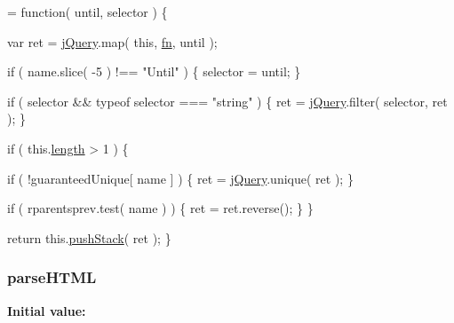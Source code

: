\begin{DoxyCode}
= \textcolor{keyword}{function}( until, selector ) \{


        var ret = \hyperlink{jquery-1_810_82-vsdoc_8js_add5237586d970a38a81f990e8eb28c6c}{jQuery}.map( \textcolor{keyword}{this}, \hyperlink{jquery-1_810_82-vsdoc_8js_acef6bdaf6b9b20fdcca1ea86f0902c3b}{fn}, until );

        \textcolor{keywordflow}{if} ( name.slice( -5 ) !== \textcolor{stringliteral}{"Until"} ) \{
            selector = until;
        \}

        \textcolor{keywordflow}{if} ( selector && typeof selector === \textcolor{stringliteral}{"string"} ) \{
            ret = \hyperlink{jquery-1_810_82-vsdoc_8js_add5237586d970a38a81f990e8eb28c6c}{jQuery}.filter( selector, ret );
        \}

        \textcolor{keywordflow}{if} ( this.\hyperlink{jquery-1_810_82-vsdoc_8js_aa7de35d58da66d9944ab9cbe82c19640}{length} > 1 ) \{
            
            \textcolor{keywordflow}{if} ( !guaranteedUnique[ name ] ) \{
                ret = \hyperlink{jquery-1_810_82-vsdoc_8js_add5237586d970a38a81f990e8eb28c6c}{jQuery}.unique( ret );
            \}

            
            \textcolor{keywordflow}{if} ( rparentsprev.test( name ) ) \{
                ret = ret.reverse();
            \}
        \}

        \textcolor{keywordflow}{return} this.\hyperlink{jquery-1_810_82-vsdoc_8js_afc3a7db1ef2b526338c06c07cecccd44}{pushStack}( ret );
    \}
\end{DoxyCode}
\hypertarget{jquery-1_810_82-vsdoc_8js_a09aeded1ab567632f194acd1550eac88}{
\subsubsection[{parse\-H\-T\-M\-L}]{ parse\-H\-T\-M\-L}}\label{jquery-1_810_82-vsdoc_8js_a09aeded1ab567632f194acd1550eac88}
{\bfseries Initial value\-:}
